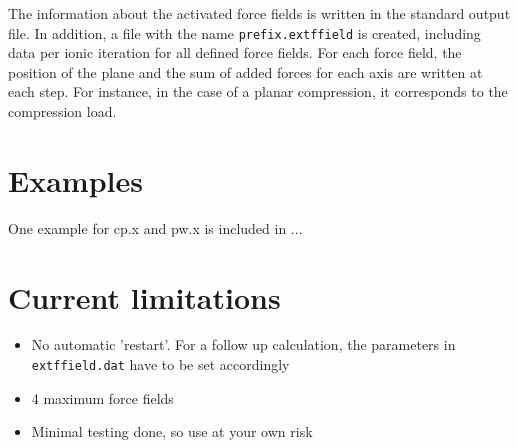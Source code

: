 \documentclass[a4paper,12pt,notitlepage]{article}
\begin{document}
The information about the activated force fields is written in the standard output file. In addition, a file with the name \texttt{prefix.extffield} is created, including data per ionic iteration for all defined force fields. For each force field, the position of the plane and the sum of added forces for each axis are written at each step. For instance, in the case of a planar compression, it corresponds to the compression load. 

\section{Examples}

One example for cp.x and pw.x is included in ...

\section{Current limitations}

\begin{itemize}
\item No automatic 'restart'. For a follow up calculation, the parameters in \texttt{extffield.dat} have to be set accordingly
\item 4 maximum force fields
\item Minimal testing done, so use at your own risk
\end{itemize}
\end{document}
